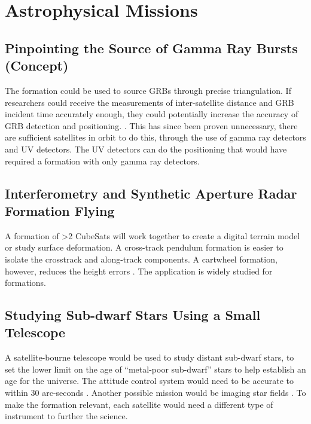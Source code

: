 \section{Astrophysical Missions}

\subsection{Pinpointing the Source of Gamma Ray Bursts (Concept)}
\label{gamma_burst}

The formation could be used to source GRBs through precise triangulation. If researchers could receive the measurements of inter-satellite distance and GRB incident time accurately enough, they could potentially increase the accuracy of GRB detection and positioning. \cite{Ref:Dill}. This has since been proven unnecessary, there are sufficient satellites in orbit to do this, through the use of gamma ray detectors and UV detectors. The UV detectors can do the positioning that would have required a formation with only gamma ray detectors. 

\subsection{Interferometry and Synthetic Aperture Radar Formation Flying}
\label{sar}

A formation of >2 CubeSats will work together to create a digital
terrain model or study surface deformation. A cross-track pendulum
formation is easier to isolate the crosstrack and along-track components. A cartwheel formation, however, reduces the height errors \cite{Ref:Peterson}. The application is widely studied for formations. 

\subsection{Studying Sub-dwarf Stars Using a Small Telescope}
\label{dwarf}
A satellite-bourne telescope would be used to study distant sub-dwarf stars, to set the lower limit on the age of ``metal-poor sub-dwarf'' stars to help establish an age for the universe. The attitude control system would need to be accurate to within 30 arc-seconds \cite{Ref:Carroll2}. Another possible mission would be imaging star fields \cite{Ref:Nicholas}. To make the formation relevant, each satellite would need a different type of instrument to further the science. 

